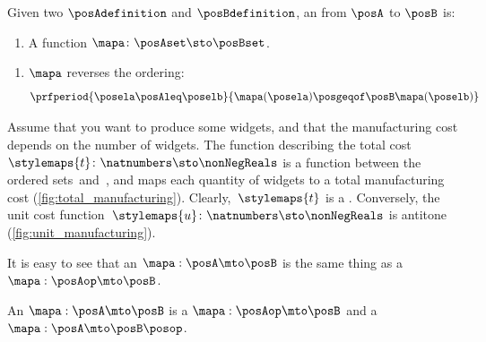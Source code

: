 \begin{definition}
    \label{def:antitone}
    Given two  $\posAdefinition$ and $\posBdefinition$, an  from $\posA$ to $\posB$ is:

    \constit
    \begin{enumerate}
        \item A function $\mapa \colon \posAset \sto \posBset$.
    \end{enumerate}

    \condit
    \begin{enumerate}
        \item $\mapa$ reverses the ordering:
              \begin{equation}
                  \prfperiod{
                      \posela \posAleq \poselb
                  }{
                      \mapa(\posela) \posgeqof\posB \mapa(\poselb)
                  }
              \end{equation}
    \end{enumerate}
\end{definition}

\begin{example}
    Assume that you want to produce some widgets, and that the manufacturing cost depends on the number of widgets.
    The function describing the total cost~$\stylemaps{t}\colon \natnumbers \sto \nonNegReals$ is a function between the ordered sets~\natnumbers and~\nonNegReals, and maps each quantity of widgets to a total manufacturing cost (\cref{fig:total_manufacturing}).
    Clearly,~$\stylemaps{t}$ is a .
    Conversely, the unit cost function~$\stylemaps{u}\colon \natnumbers \sto \nonNegReals$ is antitone (\cref{fig:unit_manufacturing}).
\end{example}

\begin{marginfigure}

    \caption{Unit and total costs vs. number of widgets.}
\end{marginfigure}



It is easy to see that an  $\mapa: \posA \mto \posB$ is the same thing as a  $\mapa: \posAop \mto \posB$.

\begin{lemma}\label{lem:antitone-is-monotone}
    An  $\mapa: \posA \mto \posB$ is a  $\mapa: \posAop \mto \posB$
    and a  $\mapa: \posA \mto \posB\posop$.
\end{lemma}

